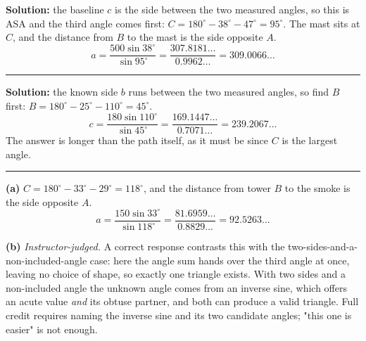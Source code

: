 \documentclass[12pt]{article}
\begin{document}
\textbf{Solution:} the baseline $c$ is the side between the two measured angles, so this is ASA and the third angle comes first:
$C = 180^\circ - 38^\circ - 47^\circ = 95^\circ$. The mast sits at $C$, and the distance from $B$ to the mast is the side opposite $A$.
\[ a = \frac{500\sin 38^\circ}{\sin 95^\circ} = \frac{307.8181\ldots}{0.9962\ldots} = 309.0066\ldots \]

\vspace{0.12cm}\noindent\rule{\linewidth}{0.2pt}\vspace{0.12cm}


\textbf{Solution:} the known side $b$ runs between the two measured angles, so find $B$ first:
$B = 180^\circ - 25^\circ - 110^\circ = 45^\circ$.
\[ c = \frac{180\sin 110^\circ}{\sin 45^\circ} = \frac{169.1447\ldots}{0.7071\ldots} = 239.2067\ldots \]
The answer is longer than the path itself, as it must be since $C$ is the largest angle. 

\vspace{0.12cm}\noindent\rule{\linewidth}{0.2pt}\vspace{0.12cm}


\textbf{(a)} $C = 180^\circ - 33^\circ - 29^\circ = 118^\circ$, and the distance from tower $B$ to the smoke is the side opposite $A$.
\[ a = \frac{150\sin 33^\circ}{\sin 118^\circ} = \frac{81.6959\ldots}{0.8829\ldots} = 92.5263\ldots \]

\textbf{(b)} \emph{Instructor-judged.} A correct response contrasts this with the two-sides-and-a-non-included-angle case: here the angle sum hands over the third angle at once, leaving no choice of shape, so exactly one triangle exists. With two sides and a non-included angle the unknown angle comes from an inverse sine, which offers an acute value \emph{and} its obtuse partner, and both can produce a valid triangle. Full credit requires naming the inverse sine and its two candidate angles; "this one is easier" is not enough.
\end{document}
